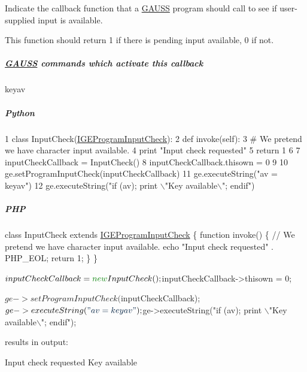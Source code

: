 Indicate the callback function that a \hyperlink{class_g_a_u_s_s}{G\-A\-U\-S\-S} program should call to see if user-\/supplied input is available. 

This function should return 1 if there is pending input available, 0 if not.

\subparagraph*{\hyperlink{class_g_a_u_s_s}{G\-A\-U\-S\-S} commands which activate this callback}


\begin{DoxyItemize}
\item {\ttfamily keyav}
\end{DoxyItemize}

\subparagraph*{Python}


\begin{DoxyCode}
1 \textcolor{keyword}{class }InputCheck(\hyperlink{class_i_g_e_program_input_check}{IGEProgramInputCheck}):
2     \textcolor{keyword}{def }invoke(self):
3         \textcolor{comment}{# We pretend we have character input available.}
4         \textcolor{keywordflow}{print} \textcolor{stringliteral}{"Input check requested"}
5         \textcolor{keywordflow}{return} 1
6 
7 inputCheckCallback = InputCheck()
8 inputCheckCallback.thisown = 0
9 
10 ge.setProgramInputCheck(inputCheckCallback)
11 ge.executeString(\textcolor{stringliteral}{"av = keyav"})
12 ge.executeString(\textcolor{stringliteral}{"if (av); print \(\backslash\)"Key available\(\backslash\)"; endif"})
\end{DoxyCode}


\subparagraph*{P\-H\-P}


\begin{DoxyCode}
\textcolor{keyword}{class }InputCheck \textcolor{keyword}{extends} \hyperlink{class_i_g_e_program_input_check}{IGEProgramInputCheck} \{
    \textcolor{keyword}{function} invoke() \{
        \textcolor{comment}{// We pretend we have character input available.}
        echo \textcolor{stringliteral}{"Input check requested"} . PHP\_EOL;
        \textcolor{keywordflow}{return} 1;
    \}
\}

$inputCheckCallback = \textcolor{keyword}{new} InputCheck();
$inputCheckCallback->thisown = 0;

$ge->setProgramInputCheck($inputCheckCallback);
$ge->executeString(\textcolor{stringliteral}{"av = keyav"});
$ge->executeString(\textcolor{stringliteral}{"if (av); print \(\backslash\)"Key available\(\backslash\)"; endif"});
\end{DoxyCode}
 results in output\-: 
\begin{DoxyCode}
Input check requested
Key available
\end{DoxyCode}



